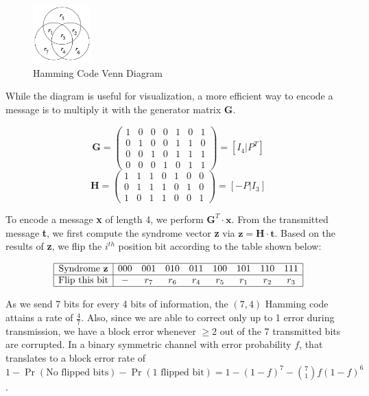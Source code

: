 \documentclass[12pt, a4paper]{article}
\begin{document}
\begin{figure}[H]
	\centering
	\includegraphics[width=0.2\textwidth]{hamming_code_circles.png}
	\caption{Hamming Code Venn Diagram}
\end{figure}

While the diagram is useful for visualization, a more efficient way to encode a message is to multiply it with the generator matrix \textbf{G}.

$$
\textbf{G} = 
\left(
\begin{array}{ccccccc}
1 & 0 & 0 & 0 & 1 & 0 & 1\\
0 & 1 & 0 & 0 & 1 & 1 & 0\\
0 & 0 & 1 & 0 & 1 & 1 & 1\\
0 & 0 & 0 & 1 & 0 & 1 & 1
\end{array}
\right)
=
\left[
I_4 \vert P^T
\right]
$$
$$
\textbf{H} =
\left(
\begin{array}{ccccccc}
1 & 1 & 1 & 0 & 1 & 0 & 0\\
0 & 1 & 1 & 1 & 0 & 1 & 0\\
1 & 0 & 1 & 1 & 0 & 0 & 1
\end{array}
\right)
=
\left[
-P \vert I_3
\right]
$$

To encode a message \textbf{x} of length 4, we perform $\textbf{G}^T \cdot \textbf{x}$. From the transmitted message \textbf{t}, we first compute the syndrome vector \textbf{z} via $\textbf{z} = \textbf{H} \cdot \textbf{t}$. Based on the results of \textbf{z}, we flip the $i^{th}$ position bit according to the table shown below:

$$
\begin{array}{|c|cccccccc|}
\hline
\text{Syndrome \textbf{z}} 	& 000 & 001 & 010 & 011 & 100 & 101 & 110 & 111\\
\hline
\text{Flip this bit} 		&  -  & r_7 & r_6 & r_4 & r_5 & r_1 & r_2 & r_3\\
\hline
\end{array}
$$

As we send 7 bits for every 4 bits of information, the $(7,4)$ Hamming code attains a rate of $\frac{4}{7}$. Also, since we are able to correct only up to 1 error during transmission, we have a block error whenever $\geq 2$ out of the 7 transmitted bits are corrupted. In a binary symmetric channel with error probability $f$, that translates to a block error rate of $1 - \Pr(\text{No flipped bits}) - \Pr(\text{1 flipped bit}) = 1 - (1-f)^7 - \binom{7}{1}f(1-f)^6$.
\end{document}
